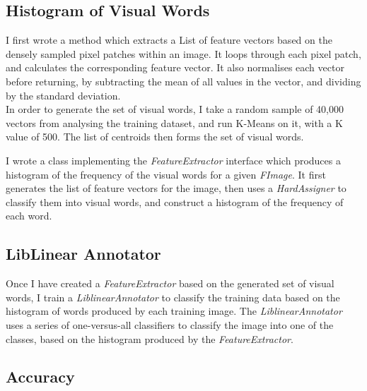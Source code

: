 \documentclass{article}
\begin{document}
	\subsection{ Histogram of Visual Words }
	
	I first wrote a method which extracts a List of feature vectors based on the densely sampled pixel patches within an image. It loops through each pixel patch, and calculates the corresponding feature vector. It also normalises each vector before returning, by subtracting the mean of all values in the vector, and dividing by the standard deviation.\\
	In order to generate the set of visual words, I take a random sample of 40,000 vectors from analysing the training dataset, and run K-Means on it, with a K value of 500. The list of centroids then forms the set of visual words.\\
	\newline
	
	I wrote a class implementing the \textit{FeatureExtractor} interface which produces a histogram of the frequency of the visual words for a given \textit{FImage}. It first generates the list of feature vectors for the image, then uses a \textit{HardAssigner} to classify them into visual words, and construct a histogram of the frequency of each word.
	
	\subsection{ LibLinear Annotator }
	
	Once I have created a \textit{FeatureExtractor} based on the generated set of visual words, I train a \textit{LiblinearAnnotator} to classify the training data based on the histogram of words produced by each training image. The \textit{LiblinearAnnotator} uses a series of one-versus-all classifiers to classify the image into one of the classes, based on the histogram produced by the \textit{FeatureExtractor}.
	
	\subsection{ Accuracy }
	
\end{document}
